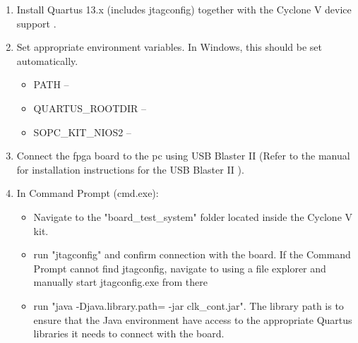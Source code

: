 \documentclass[main.tex]{subfiles}
\begin{document}
\begin{enumerate}
  \item Install Quartus 13.x (includes jtagconfig) together with the Cyclone V device support \cite{altera_q13}.
  \item Set appropriate environment variables. In Windows, this should be set automatically.
  \begin{itemize}
      \item PATH -- 
      \item QUARTUS\_ROOTDIR -- 
      \item SOPC\_KIT\_NIOS2 -- 
    \end{itemize}
  \item Connect the \gls{fpga} board to the \gls{pc} using USB Blaster II (Refer to the manual for installation instructions for the USB Blaster II \cite{altera_usb}).
  \item In Command Prompt (cmd.exe):
  \begin{itemize}
      \item Navigate to the "board\_test\_system" folder located inside the Cyclone V kit.
      \item run "jtagconfig" and confirm connection with the board. If the Command Prompt cannot find jtagconfig, navigate to  using a file explorer and manually start jtagconfig.exe from there
      \item run "java -Djava.library.path= -jar clk\_cont.jar". The library path is to ensure that the Java environment have access to the appropriate Quartus libraries it needs to connect with the board.
    \end{itemize}
\end{enumerate}
\end{document}
